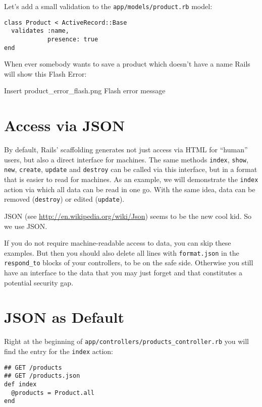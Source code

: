 \documentclass[a4paper]{book}
\begin{document}
Let's add a small validation to the \texttt{app/models/product.rb} model:

\begin{shaded}\begin{verbatim}
class Product < ActiveRecord::Base
  validates :name,
            presence: true
end
\end{verbatim}\end{shaded}

When ever somebody wants to save a product which doesn't have a name Rails will show this Flash Error:

Insert product\_error\_flash.png Flash error message

\section{Access via JSON}\label{access-via-json}

By default, Rails' scaffolding generates not just access via HTML for “human” users, but also a direct interface for machines. The same methods \texttt{index}, \texttt{show}, \texttt{new}, \texttt{create}, \texttt{update} and \texttt{destroy} can be called via this interface, but in a format that is easier to read for machines. As an example, we will demonstrate the \texttt{index} action via which all data can be read in one go. With the same idea, data can be removed (\texttt{destroy}) or edited (\texttt{update}).

JSON (see \href{http://de.wikipedia.org/wiki/JavaScript_Object_Notation}{http://en.wikipedia.org/wiki/Json}) seems to be the new cool kid. So we use JSON.

If you do not require machine-readable access to data, you can skip these examples. But then you should also delete all lines with \texttt{format.json} in the \texttt{respond\_to} blocks of your controllers, to be on the safe side. Otherwise you still have an interface to the data that you may just forget and that constitutes a potential security gap.

\section{JSON as Default}\label{json-as-default}

Right at the beginning of \texttt{app/controllers/products\_controller.rb} you will find the entry for the \texttt{index} action:

\begin{shaded}\begin{verbatim}
## GET /products
## GET /products.json
def index
  @products = Product.all
end
\end{verbatim}\end{shaded}
\end{document}
